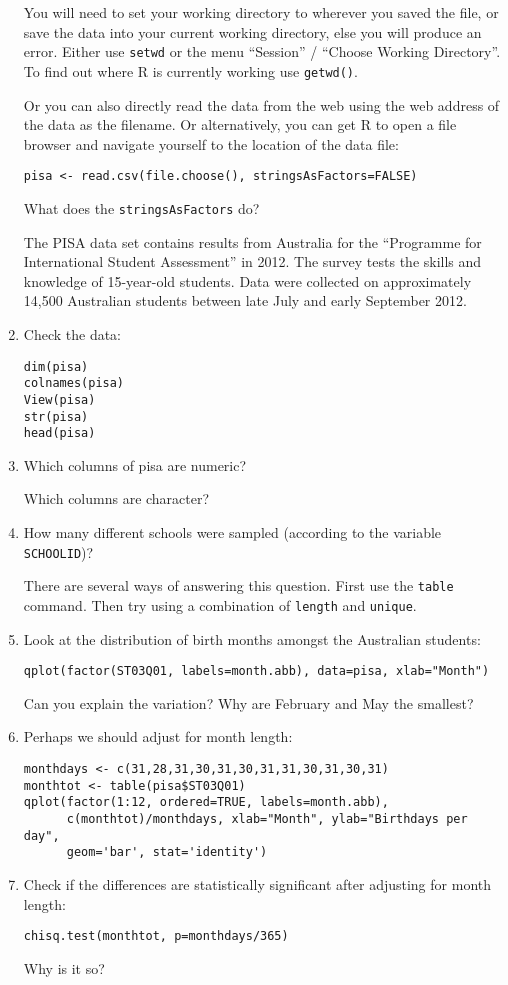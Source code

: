 \documentclass[11pt]{article}
\begin{document}
\begin{enumerate}
You will need to set your working directory to wherever you saved the file, or save the data into your current working directory, else you will produce an error.  Either use \verb|setwd| or the menu ``Session'' / ``Choose Working Directory''. To find out where R is currently working use \verb|getwd()|.

Or you can also directly read the data from the web using the web address of the data as the filename. 
Or alternatively, you can get R to open a file browser and navigate yourself  to the location of the data file:

\begin{verbatim}
pisa <- read.csv(file.choose(), stringsAsFactors=FALSE)
\end{verbatim}

What does the \verb|stringsAsFactors| do?

The PISA data set contains results from Australia for the ``Programme for International Student Assessment'' in 2012. The survey tests the skills and knowledge of 15-year-old students. Data were collected on approximately 14,500 Australian students between late July and early September 2012.

\item Check the data:
\begin{verbatim}
dim(pisa)
colnames(pisa)
View(pisa)
str(pisa)
head(pisa)
\end{verbatim}

\item Which columns of pisa are numeric?

Which columns are character?

\item How many different schools were sampled (according to the variable \verb|SCHOOLID|)?

There are several ways of answering this question. First use the \verb|table| command. Then try using a combination of \verb|length| and \verb|unique|.


\item Look at the distribution of birth months amongst the Australian students:
\begin{verbatim}
qplot(factor(ST03Q01, labels=month.abb), data=pisa, xlab="Month")
\end{verbatim}
Can you explain the variation? Why are February and May the smallest?

\item Perhaps we should adjust for month length:
\begin{verbatim}
monthdays <- c(31,28,31,30,31,30,31,31,30,31,30,31)
monthtot <- table(pisa$ST03Q01)
qplot(factor(1:12, ordered=TRUE, labels=month.abb), 
      c(monthtot)/monthdays, xlab="Month", ylab="Birthdays per day",
      geom='bar', stat='identity')
\end{verbatim}
\item Check if the differences are statistically significant after adjusting for month length:
\begin{verbatim}
chisq.test(monthtot, p=monthdays/365)
\end{verbatim}
Why is it so?


\end{enumerate}
\end{document}
